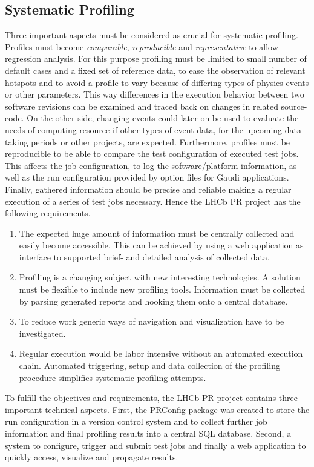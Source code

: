 \documentclass[a4paper]{jpconf}
\begin{document}
\subsection{Systematic Profiling}
\label{sec:integrated_profiling}

Three important aspects must be considered as crucial for systematic profiling. Profiles must become \textit{comparable}, \textit{reproducible} and \textit{representative} to allow regression analysis. For this purpose profiling must be limited to small number of default cases and a fixed set of reference data, to ease the observation of relevant hotspots and to avoid a profile to vary because of differing types of physics events or other parameters. This way differences in the execution behavior between two software revisions can be examined and traced back on changes in related source-code. On the other side, changing events could later on be used to evaluate the needs of computing resource if other types of event data, for the upcoming data-taking periods or other projects, are expected.
\newline
Furthermore, profiles must be reproducible to be able to compare the test configuration of executed test jobs. This affects the job configuration, to log the software/platform information, as well as the run configuration provided by option files for Gaudi applications. Finally, gathered information should be precise and reliable making a regular execution of a series of test jobs necessary.
\newline
Hence the LHCb PR project has the following requirements.
\begin{enumerate}
 \item The expected huge amount of information must be centrally collected and easily become accessible. This can be achieved by using a web application as interface to supported brief- and detailed analysis of collected data. 
 \item Profiling is a changing subject with new interesting technologies. A solution must be flexible to include new profiling tools. Information must be collected by parsing generated reports and hooking them onto a central database.
 \item To reduce work generic ways of navigation and visualization have to be investigated.
 \item Regular execution would be labor intensive without an automated execution chain. Automated triggering, setup and data collection of the profiling procedure simplifies systematic profiling attempts.
\end{enumerate}
To fulfill the objectives and requirements, the LHCb PR project contains three important technical aspects. First, the PRConfig package was created to store the run configuration in a version control system and to collect further job information and final profiling results into a central SQL database. Second, a system to configure, trigger and submit test jobs and finally a web application to quickly access, visualize and propagate results.
\end{document}

